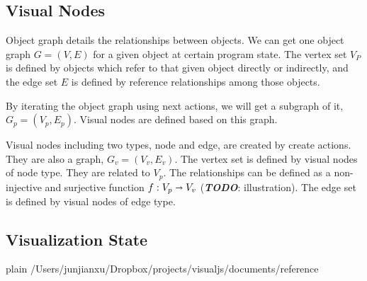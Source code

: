 \documentclass [a4paper,11pt]{article}
\begin{document}
\subsection {Visual Nodes}
Object graph details the relationships between objects. We can get one object graph \(G = (V, E)\) for a given object at certain program state. The vertex set $V_P$ is defined by objects which refer to that given object directly or indirectly, and the edge set $E$ is defined by reference relationships among those objects.

By iterating the object graph using next actions, we will get a subgraph of it, \(G_p = (V_p, E_p)\). Visual nodes are defined based on this graph. 

Visual nodes including two types, node and edge, are created by create actions. They are also a graph, \(G_v = (V_v, E_v)\). The vertex set is defined by visual nodes of node type. They are related to $V_p$. The relationships can be defined as a non-injective and surjective function \(f:V_p\shortrightarrow V_v\) (\textbf{\textit{TODO}}: illustration). The edge set is defined by visual nodes of edge type.

\subsection {Visualization State}

\newpage
 {plain}
 {/Users/junjianxu/Dropbox/projects/visualjs/documents/reference}
\end{document}
